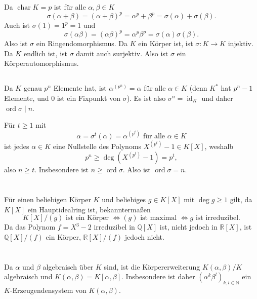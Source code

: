 \documentclass[a4paper,10pt]{article}
\theoremstyle{definition}
\newcommand{\N}{\mathbb{N}}
\newcommand{\Q}{\mathbb{Q}}
\newcommand{\R}{\mathbb{R}}
\newcommand{\id}{\operatorname{id}}
\newcommand{\ord}{\operatorname{ord}}
\newcommand{\kchar}{\operatorname{char}}
\begin{document}
Da $\kchar K = p$ ist für alle $\alpha, \beta \in K$
\[
 \sigma(\alpha + \beta) = (\alpha + \beta)^p = \alpha^p + \beta^p = \sigma(\alpha) + \sigma(\beta).
\]
Auch ist $\sigma(1) = 1^p = 1$ und
\[
 \sigma(\alpha\beta) = (\alpha\beta)^p = \alpha^p \beta^p = \sigma(\alpha) \sigma(\beta).
\]
Also ist $\sigma$ ein Ringendomorphismus. Da $K$ ein Körper ist, ist $\sigma : K \rightarrow K$ injektiv. Da $K$ endlich ist, ist $\sigma$ damit auch surjektiv. Also ist $\sigma$ ein Körperautomorphismus.


\subsection{}
Da $K$ genau $p^n$ Elemente hat, ist $\alpha^{(p^n)} = \alpha$ für alle $\alpha \in K$ (denn $K^*$ hat $p^n-1$ Elemente, und $0$ ist ein Fixpunkt von $\sigma$). Es ist also $\sigma^n = \id_K$ und daher $\ord \sigma \mid n$.

Für $t \geq 1$ mit
\[
 \alpha = \sigma^t(\alpha) = \alpha^{(p^t)} \text{ für alle } \alpha \in K
\]
ist jedes $\alpha \in K$ eine Nullstelle des Polynoms $X^{(p^t)} -1 \in K[X]$, weshalb
\[
 p^n \geq \deg \left( X^{(p^t)}-1 \right) = p^t,
\]
also $n \geq t$. Insbesondere ist $n \geq \ord \sigma$. Also ist $\ord \sigma = n$.





\section{}
Für einen beliebigen Körper $K$ und beliebiges $g \in K[X]$ mit $\deg g \geq 1$ gilt, da $K[X]$ ein Hauptidealring ist, bekanntermaßen
\[
 K[X]/(g) \text{ ist ein Körper }
 \Leftrightarrow (g) \text{ ist maximal }
 \Leftrightarrow g \text{ ist irreduzibel}.
\]
Da das Polynom $f = X^3 - 2$ irreduzibel in $\Q[X]$ ist, nicht jedoch in $\R[X]$, ist $\Q[X]/(f)$ ein Körper, $\R[X]/(f)$ jedoch nicht.





\section{}


\subsection{}
Da $\alpha$ und $\beta$ algebraisch über $K$ sind, ist die Körpererweiterung $K(\alpha,\beta)/K$ algebraisch und $K(\alpha, \beta) = K[\alpha, \beta]$. Insbesondere ist daher $(\alpha^k \beta^l)_{k,l \in \N}$ ein $K$-Erzeugenden\-system von $K(\alpha,\beta)$.
\end{document}
